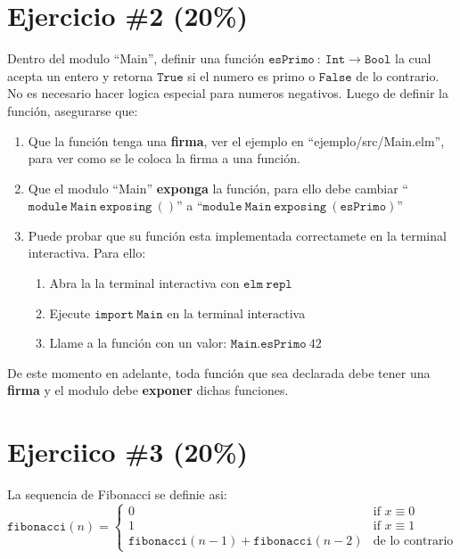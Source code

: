 \documentclass{article}
\begin{document}
\section*{Ejercicio \#2 (20\%)}
Dentro del modulo ``Main'', definir una funci\'on $\mathtt{esPrimo}\ :\ 
\mathtt{Int}\rightarrow\mathtt{Bool}$ la cual acepta un entero y retorna
$\mathtt{True}$ si el numero es primo o $\mathtt{False}$ de lo contrario.
No es necesario hacer logica especial para numeros negativos.
Luego de definir la funci\'on, asegurarse que:
\begin{enumerate}
        \item{Que la funci\'on tenga una {\bf firma}, ver el ejemplo
        en ``ejemplo/src/Main.elm'', para ver como se le coloca la
        firma a una funci\'on.}
        \item{Que el modulo ``Main'' {\bf exponga} la funci\'on, para ello
        debe cambiar ``$\mathtt{module\ Main\ exposing\ ()}$'' a
        ``$\mathtt{module\ Main\ exposing\ (esPrimo)}$''}
        \item{Puede probar que su funci\'on esta implementada correctamete
        en la terminal interactiva. Para ello:
        \begin{enumerate}
                \item{Abra la la terminal interactiva con $\mathtt{elm\ repl}$}
                \item{Ejecute $\mathtt{import\ Main}$ en la terminal interactiva}
                \item{Llame a la funci\'on con un valor: $\mathtt{Main.esPrimo}\ 42$}
        \end{enumerate}
        }
\end{enumerate}
De este momento en adelante, toda funci\'on que sea declarada debe tener
una {\bf firma} y el modulo debe {\bf exponer} dichas funciones.

\section*{Ejerciico \#3 (20\%)}
La sequencia de Fibonacci se definie asi:
\[
        \mathtt{fibonacci}(n) =
        \left\{
                \begin{array}{ll}
                        0  & \mbox{if } x \equiv 0 \\
                        1 & \mbox{if } x \equiv 1 \\
                        \mathtt{fibonacci}(n-1)+\mathtt{fibonacci}(n-2) & \mbox{de lo contrario}

                \end{array}
        \right.\]
\end{document}
